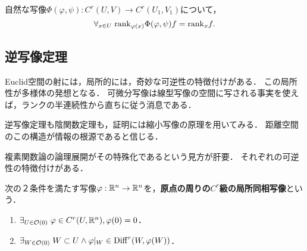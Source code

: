 \documentclass[uplatex,dvipdfmx]{jsreport}
\begin{document}
\begin{lemma}
    自然な写像$\Phi(\varphi,\psi):C^r(U,V)\to C^r(U_1,V_1)$について，
    \[\forall_{x\in U}\;\mathrm{rank}_{\varphi(x)}\Phi(\varphi,\psi)f=\mathrm{rank}_xf.\]
\end{lemma}

\subsection{逆写像定理}

\begin{tcolorbox}[colframe=ForestGreen, colback=ForestGreen!10!white,breakable,colbacktitle=ForestGreen!40!white,coltitle=black,fonttitle=\bfseries\sffamily,
title=]
    Euclid空間の射には，局所的には，奇妙な可逆性の特徴付けがある．
    この局所性が多様体の発想となる．
    可微分写像は線型写像の空間に写される事実を使えば，ランクの半連続性から直ちに従う消息である．

    逆写像定理も陰関数定理も，証明には縮小写像の原理を用いてみる．
    距離空間のこの構造が情報の根源であると信じる．

    複素関数論の論理展開がその特殊化であるという見方が肝要．
    それぞれの可逆性の特徴付けがある．
\end{tcolorbox}

\begin{definition}[局所同相]
    次の２条件を満たす写像$\varphi:\mathbb{R}^n\to\mathbb{R}^n$を，\textbf{原点の周りの$C^r$級の局所同相写像}という．
    \begin{enumerate}
        \item $\exists_{U\in\mathcal{O}(0)}\;\varphi\in C^r(U,\mathbb{R}^n),\varphi(0)=0$．
        \item $\exists_{W\in\mathcal{O}(0)}\;W\subset U\land \varphi|_W\in\mathrm{Diff}^r(W,\varphi(W))$．
    \end{enumerate}
\end{definition}
\end{document}
